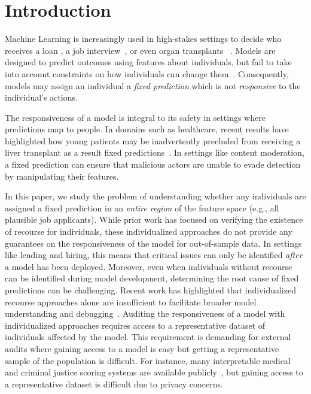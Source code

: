 \section{Introduction}

Machine Learning is increasingly used in high-stakes settings to decide who receives a loan \citep{hurley2016credit}, a job interview~\citep{bogen2018help}, or even organ transplants ~\citep{murgia2023algorithms}. Models are designed to predict outcomes using features about individuals, but fail to take into account constraints on how individuals can change them~\citep[][]{liu2024actionability}. Consequently, models may assign an individual a \emph{fixed prediction} which is not \emph{responsive} to the individual's actions.

The responsiveness of a model is integral to its safety in settings where predictions map to people. In domains such as healthcare, recent results have highlighted how young patients may be inadvertently precluded from receiving a liver transplant as a result fixed predictions~\cite{murgia2023algorithms}. In settings like content moderation, a fixed prediction can ensure that malicious actors are unable to evade detection by manipulating their features. %

In this paper, we study the problem of understanding whether any individuals are assigned a fixed prediction in an \emph{entire region} of the feature space (e.g., all plausible job applicants). 
While prior work has focused on verifying the existence of recourse for individuals, these individualized approaches do not provide any guarantees on the responsiveness of the model for out-of-sample data. In settings like lending and hiring, this means that critical issues can only be identified \emph{after} a model has been deployed. Moreover, even when individuals without recourse can be identified during model development, determining the root cause of fixed predictions can be challenging. Recent work has highlighted that individualized recourse approaches alone are insufficient to facilitate broader model understanding and debugging~\citep{rawal2020algorithmic}. Auditing the responsiveness of a model with individualized approaches requires access to a representative dataset of individuals affected by the model. This requirement is demanding for external audits where gaining access to a model is easy but getting a representative sample of the population is difficult. For instance, many interpretable medical and criminal justice scoring systems are available publicly~\citep[see e.g.,][]{morrison2022optimized, yamga2023optimized, ribeiro2023use, PennSentence}, but gaining access to a representative dataset is difficult due to privacy concerns. %

